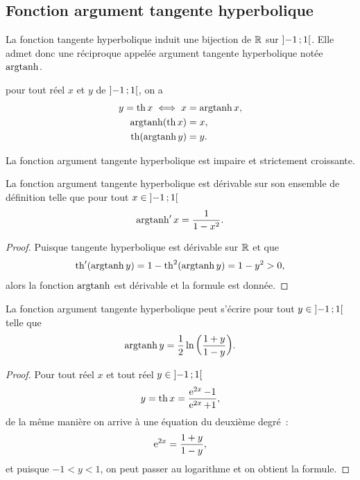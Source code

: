 \subsection{Fonction argument tangente
hyperbolique}\label{subsec:chap1-fonctionargtanh}

\begin{defdef}
  La fonction tangente hyperbolique induit une bijection de \(\mathbb{R}\) sur
  \(\left] -1 \, ; {} 1 \right[\). Elle admet donc une réciproque appelée argument
  tangente hyperbolique notée \(\operatorname{argtanh}\).
\end{defdef}

\begin{prop}
  pour tout réel \(x\) et \(y\) de \(\left] -1 \, ; {} 1 \right[\), on a
  \begin{align*}
    y = \operatorname{th}{x} \iff{} x&= \operatorname{argtanh}{x}, \\
    \operatorname{argtanh}(\operatorname{th}{x})& = x, \\
    \operatorname{th}(\operatorname{argtanh}{y})& = y.
  \end{align*}
\end{prop}

\begin{prop}
  La fonction argument tangente hyperbolique est impaire et strictement
  croissante.
\end{prop}

\begin{prop}
  La fonction argument tangente hyperbolique est dérivable sur son ensemble de
  définition telle que pour tout \(x \in \left] -1 \, ; {} 1 \right[\)
  \begin{equation}
    \operatorname{argtanh}'{x} = \frac{1}{1-x^2}.
  \end{equation}
\end{prop}

\begin{proof}
  Puisque tangente hyperbolique est dérivable sur \(\mathbb{R}\) et que \[\operatorname{th}'(\operatorname{argtanh}
  y) = 1-\operatorname{th}^2(\operatorname{argtanh} y) = 1-y^2>0,\]
  alors la fonction \(\operatorname{argtanh}\) est dérivable et la formule est donnée.
\end{proof}

\begin{prop}
  La fonction argument tangente hyperbolique peut s'écrire pour tout \(y \in
  \left] -1 \, ; {} 1 \right[\) telle que
  \begin{equation}
    \operatorname{argtanh}{y} = \frac{1}{2} \ln{\left(\frac{1+y}{1-y}\right)}.
  \end{equation}
\end{prop}

\begin{proof}
  Pour tout réel \(x\) et tout réel \(y \in \left] -1 \, ; {} 1 \right[\) \[y = \operatorname{th}
  x = \frac{\operatorname{e}^{2x}-1}{\operatorname{e}^{2x}+1},\]
  de la même manière on arrive à une équation du deuxième degré~:
  \[\operatorname{e}^{2x} = \frac{1+y}{1-y},\]
  et puisque \(-1<y<1\), on peut passer au logarithme et on obtient la formule.
\end{proof}

